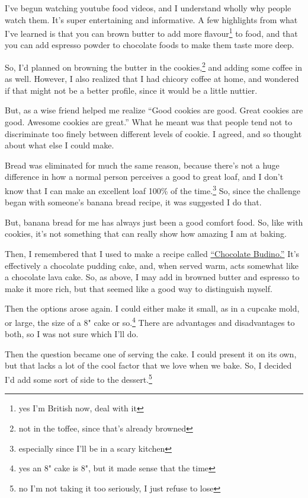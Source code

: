 \documentclass[12pt]{article}[titlepage]
\newcommand{\say}[1]{``#1''}
\newcommand{\1}{\={a}}
\newcommand{\2}{\={e}}
\newcommand{\3}{\={\i}}
\newcommand{\4}{\=o}
\newcommand{\5}{\=u}
\newcommand{\6}{\={A}}
\renewcommand{\,}{\textsuperscript{,}}
\begin{document}
I've begun watching youtube food videos, and I understand wholly why people watch them.
It's super entertaining and informative.
A few highlights from what I've learned is that you can brown butter to add more flavour\footnote{yes I'm British now, deal with it} to food, and that you can add espresso powder to chocolate foods to make them taste more deep.

So, I'd planned on browning the butter in the cookies,\footnote{not in the toffee, since that's already browned} and adding some coffee in as well.
However, I also realized that I had chicory coffee at home, and wondered if that might not be a better profile, since it would be a little nuttier.

But, as a wise friend helped me realize \say{Good cookies are good. Great cookies are good. Awesome cookies are great.}
What he meant was that people tend not to discriminate too finely between different levels of cookie.
I agreed, and so thought about what else I could make.

Bread was eliminated for much the same reason, because there's not a huge difference in how a normal person perceives a good to great loaf, and I don't know that I can make an excellent loaf 100\% of the time.\footnote{especially since I'll be in a scary kitchen}
So, since the challenge began with someone's banana bread recipe, it was suggested I do that.

But, banana bread for me has always just been a good comfort food.
So, like with cookies, it's not something that can really show how amazing I am at baking.

Then, I remembered that I used to make a recipe called \href{http://catcora.com/recipes/desserts/chocolate-budino/}{\say{Chocolate Budino.}}
It's effectively a chocolate pudding cake, and, when served warm, acts somewhat like a chocolate lava cake.
So, as above, I may add in browned butter and espresso to make it more rich, but that seemed like a good way to distinguish myself.

Then the options arose again.
I could either make it small, as in a cupcake mold, or large, the size of a 8" cake or so.\footnote{yes an 8" cake is 8", but it made sense that the time}
There are advantages and disadvantages to both, so I was not sure which I'll do.

Then the question became one of serving the cake.
I could present it on its own, but that lacks a lot of the cool factor that we love when we bake.
So, I decided I'd add some sort of side to the dessert.\footnote{no I'm not taking it too seriously, I just refuse to lose}
\end{document}
